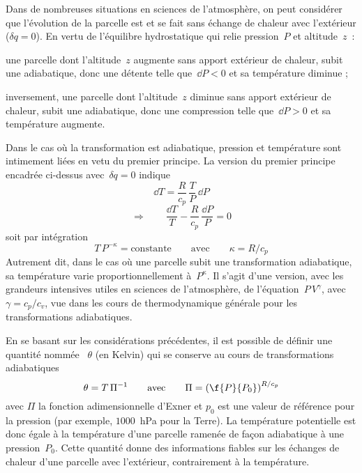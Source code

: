 \sk
Dans de nombreuses situations en sciences de l'atmosphère, on peut considérer que l'évolution de la parcelle est  et se fait sans échange de chaleur avec l'extérieur ($\delta q=0$). En vertu de l'équilibre hydrostatique qui relie pression~$P$ et altitude~$z$~:
\begin{citemize}
\item une parcelle dont l'altitude~$z$ augmente sans apport extérieur de chaleur, subit une  adiabatique, donc une détente telle que~$\dd P < 0$ et sa température diminue ;
\item inversement, une parcelle dont l'altitude~$z$ diminue sans apport extérieur de chaleur, subit une  adiabatique, donc une compression telle que~$\dd P > 0$ et sa température augmente. 
\end{citemize}

\sk
Dans le cas où la transformation est adiabatique, pression et température sont intimement liées en vetu du premier principe. La version du premier principe encadrée ci-dessus avec~$\delta q = 0$ indique
\[ \dd T = \frac{R}{c_p} \, \frac{T}{P} \, \dd P\]
\[ \Rightarrow \qquad \frac{\dd T}{T} - \frac{R}{c_p} \, \frac{\dd P}{P} = 0 \]
soit par intégration
\[ T \, P^{- \kappa} = \text{constante} \qquad \text{avec} \qquad \kappa = R / c_p \]
Autrement dit, dans le cas où une parcelle subit une transformation adiabatique, sa température varie proportionnellement à~$P^{\kappa}$. Il s'agit d'une version, avec les grandeurs intensives utiles en sciences de l'atmosphère, de l'équation~$P\,V^{\gamma}$, avec $\gamma = c_p / c_v$, vue dans les cours de thermodynamique générale pour les transformations adiabatiques.

\sk
En se basant sur les considérations précédentes, il est possible de définir une quantité nommée ~$\theta$ (en Kelvin) qui se conserve au cours de transformations adiabatiques
\[ \theta  = T \, \Pi^{-1} \qquad \textrm{avec} \qquad \Pi = \left( \f{P}{P_0} \right)^{R/c_p} \]
\noindent avec $\Pi$ la fonction adimensionnelle d'Exner et $p_0$ est une valeur de référence pour la pression (par exemple, $1000$~hPa pour la Terre). La température potentielle est donc égale à la température d'une parcelle ramenée de façon adiabatique à une pression~$P_0$. Cette quantité donne des informations fiables sur les échanges de chaleur d'une parcelle avec l'extérieur, contrairement à la température.
